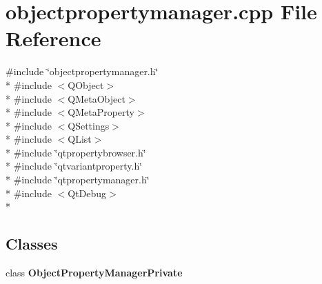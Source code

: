 \section{objectpropertymanager.\+cpp File Reference}
\label{objectpropertymanager_8cpp}
{\ttfamily \#include \char`\"{}objectpropertymanager.\+h\char`\"{}}\\*
{\ttfamily \#include $<$Q\+Object$>$}\\*
{\ttfamily \#include $<$Q\+Meta\+Object$>$}\\*
{\ttfamily \#include $<$Q\+Meta\+Property$>$}\\*
{\ttfamily \#include $<$Q\+Settings$>$}\\*
{\ttfamily \#include $<$Q\+List$>$}\\*
{\ttfamily \#include \char`\"{}qtpropertybrowser.\+h\char`\"{}}\\*
{\ttfamily \#include \char`\"{}qtvariantproperty.\+h\char`\"{}}\\*
{\ttfamily \#include \char`\"{}qtpropertymanager.\+h\char`\"{}}\\*
{\ttfamily \#include $<$Qt\+Debug$>$}\\*
\subsection*{Classes}
\begin{DoxyCompactItemize}
\item 
class {\bf Object\+Property\+Manager\+Private}
\end{DoxyCompactItemize}
